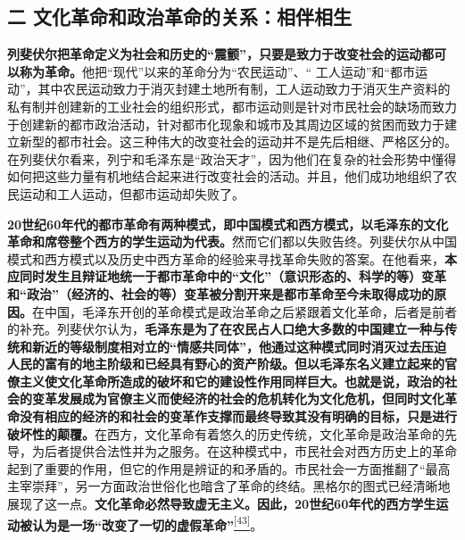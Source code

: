 \documentclass[UTF8, fontset = sourcesans, a4paper, oneside, zihao =
-4, scheme=chinese, no-math, space=true]{ctexbook}
\begin{document}
\subsection{二
文化革命和政治革命的关系：相伴相生}\label{part0008_split_003.htmlux5cux23c044}

\textbf{列斐伏尔把革命定义为社会和历史的``震颤''，只要是致力于改变社会的运动都可以称为革命。}他把``现代''以来的革命分为``农民运动''、``
工人运动''和``都市运动''，其中农民运动致力于消灭封建土地所有制，工人运动致力于消灭生产资料的私有制并创建新的工业社会的组织形式，都市运动则是针对市民社会的缺场而致力于创建新的都市政治活动，针对都市化现象和城市及其周边区域的贫困而致力于建立新型的都市社会。这三种伟大的改变社会的运动并不是先后相继、严格区分的。在列斐伏尔看来，列宁和毛泽东是``政治天才''，因为他们在复杂的社会形势中懂得如何把这些力量有机地结合起来进行改变社会的活动。并且，他们成功地组织了农民运动和工人运动，但都市运动却失败了。

\textbf{20世纪60年代的都市革命有两种模式，即中国模式和西方模式，以毛泽东的文化革命和席卷整个西方的学生运动为代表。}然而它们都以失败告终。列斐伏尔从中国模式和西方模式以及历史中西方革命的经验来寻找革命失败的答案。在他看来，\textbf{本应同时发生且辩证地统一于都市革命中的``文化''（意识形态的、科学的等）变革和``政治''（经济的、社会的等）变革被分割开来是都市革命至今未取得成功的原因。}在中国，毛泽东开创的革命模式是政治革命之后紧跟着文化革命，后者是前者的补充。列斐伏尔认为，\textbf{毛泽东是为了在农民占人口绝大多数的中国建立一种与传统和新近的等级制度相对立的``情感共同体''，他通过这种模式同时消灭过去压迫人民的富有的地主阶级和已经具有野心的资产阶级。但以毛泽东名义建立起来的官僚主义使文化革命所造成的破坏和它的建设性作用同样巨大。也就是说，政治的社会的变革发展成为官僚主义而使经济的社会的危机转化为文化危机，但同时文化革命没有相应的经济的和社会的变革作支撑而最终导致其没有明确的目标，只是进行破坏性的颠覆。}在西方，文化革命有着悠久的历史传统，文化革命是政治革命的先导，为后者提供合法性并为之服务。在这种模式中，市民社会对西方历史上的革命起到了重要的作用，但它的作用是辨证的和矛盾的。市民社会一方面推翻了``最高主宰崇拜''，另一方面政治世俗化也暗含了革命的终结。黑格尔的图式已经清晰地展现了这一点。\textbf{文化革命必然导致虚无主义。因此，20世纪60年代的西方学生运动被认为是一场``改变了一切的虚假革命''}\protect\hypertarget{part0008_split_003.htmlux5cux23w43}{}{}\protect\hyperlink{part0008_split_003.htmlux5cux23m43}{\textsuperscript{{[}43{]}}}。
\end{document}
